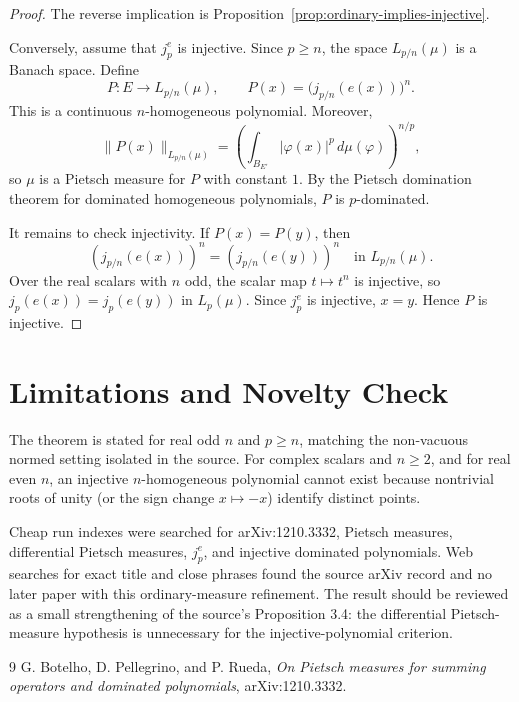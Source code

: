 \documentclass[11pt]{article}
\begin{document}
\begin{proof}
The reverse implication is Proposition~\ref{prop:ordinary-implies-injective}.

Conversely, assume that \(j_p^e\) is injective.  Since \(p\ge n\), the
space \(L_{p/n}(\mu)\) is a Banach space.  Define
\[
  P:E\longrightarrow L_{p/n}(\mu),\qquad
  P(x)=\big(j_{p/n}(e(x))\big)^n.
\]
This is a continuous \(n\)-homogeneous polynomial.  Moreover,
\[
  \|P(x)\|_{L_{p/n}(\mu)}
  =
  \left(\int_{B_{E'}}|\varphi(x)|^p\,d\mu(\varphi)\right)^{n/p},
\]
so \(\mu\) is a Pietsch measure for \(P\) with constant \(1\).  By the
Pietsch domination theorem for dominated homogeneous polynomials, \(P\)
is \(p\)-dominated.

It remains to check injectivity.  If \(P(x)=P(y)\), then
\[
  (j_{p/n}(e(x)))^n=(j_{p/n}(e(y)))^n
  \quad\text{in }L_{p/n}(\mu).
\]
Over the real scalars with \(n\) odd, the scalar map \(t\mapsto t^n\)
is injective, so \(j_p(e(x))=j_p(e(y))\) in \(L_p(\mu)\).  Since
\(j_p^e\) is injective, \(x=y\).  Hence \(P\) is injective.
\end{proof}

\section*{Limitations and Novelty Check}

The theorem is stated for real odd \(n\) and \(p\ge n\), matching the
non-vacuous normed setting isolated in the source.  For complex
scalars and \(n\ge2\), and for real even \(n\), an injective
\(n\)-homogeneous polynomial cannot exist because nontrivial roots of
unity (or the sign change \(x\mapsto -x\)) identify distinct points.

Cheap run indexes were searched for arXiv:1210.3332, Pietsch measures,
differential Pietsch measures, \(j_p^e\), and injective dominated
polynomials.  Web searches for exact title and close phrases found the
source arXiv record and no later paper with this ordinary-measure
refinement.  The result should be reviewed as a small strengthening of
the source's Proposition 3.4: the differential Pietsch-measure
hypothesis is unnecessary for the injective-polynomial criterion.

\begin{thebibliography}{9}
G. Botelho, D. Pellegrino, and P. Rueda,
\emph{On Pietsch measures for summing operators and dominated
polynomials}, arXiv:1210.3332.
\end{thebibliography}
\end{document}
